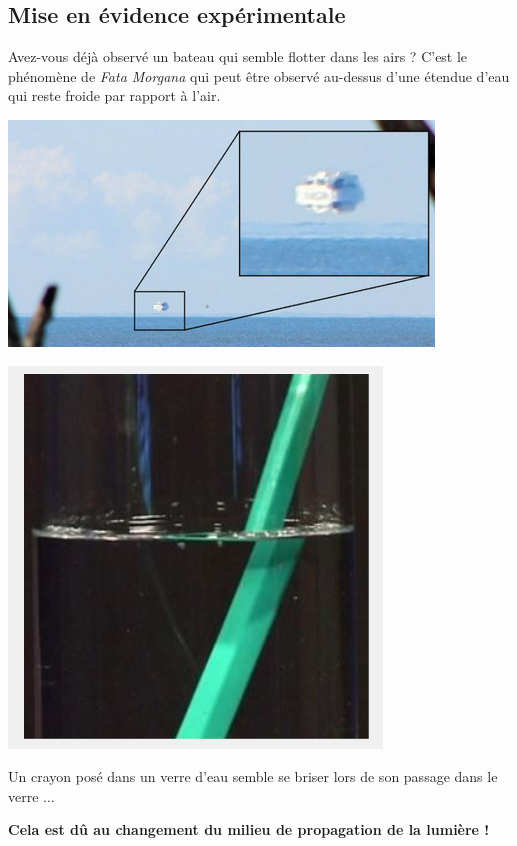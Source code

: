 \subsection{Mise en évidence expérimentale}
\begin{multicols}{2}
Avez-vous déjà observé un bateau qui semble flotter dans les airs ? C'est le phénomène de \textit{Fata Morgana} qui peut être observé au-dessus d'une étendue d'eau qui reste froide par rapport à l'air.
\begin{center}
     \includegraphics[scale=1]{Images/Mirage.PNG}
\end{center}
\begin{center}
     \includegraphics[scale=1]{Images/Crayon_brise.PNG}
\end{center}
Un crayon posé dans un verre d'eau semble se briser lors de son passage dans le verre ...
\end{multicols}
\textbf{Cela est dû au changement du milieu de propagation de la lumière !}

